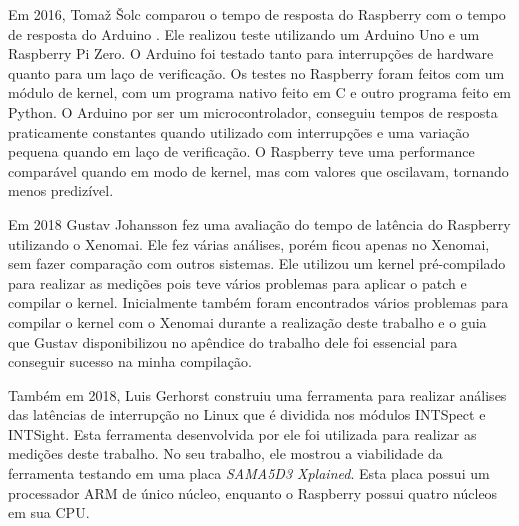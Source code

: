 Em 2016, Tomaž Šolc comparou o tempo de resposta do Raspberry com o tempo de resposta do Arduino \cite{Solc2016}. Ele realizou teste utilizando um Arduino Uno e um Raspberry Pi Zero. O Arduino foi testado tanto para interrupções de hardware quanto para um laço de verificação. Os testes no Raspberry foram feitos com um módulo de kernel, com um programa nativo feito em C e outro programa feito em Python. O Arduino por ser um microcontrolador, conseguiu tempos de resposta praticamente constantes quando utilizado com interrupções e uma variação pequena quando em laço de verificação. O Raspberry teve uma performance comparável quando em modo de kernel, mas com valores que oscilavam, tornando menos predizível.

Em 2018 Gustav Johansson \cite{Johansson2018} fez uma avaliação do tempo de latência do Raspberry utilizando o Xenomai. Ele fez várias análises, porém ficou apenas no Xenomai, sem fazer comparação com outros sistemas. Ele utilizou um kernel pré-compilado para realizar as medições pois teve vários problemas para aplicar o patch e compilar o kernel. Inicialmente também foram encontrados vários problemas para compilar o kernel com o Xenomai durante a realização deste trabalho e o guia que Gustav disponibilizou no apêndice do trabalho dele foi essencial para conseguir sucesso na minha compilação.

Também em 2018, Luis Gerhorst \cite{Gerhorst2018} construiu uma ferramenta para realizar análises das latências de interrupção no Linux que é dividida nos módulos INTSpect e INTSight. Esta ferramenta desenvolvida por ele foi utilizada para realizar as medições deste trabalho. No seu trabalho, ele mostrou a viabilidade da ferramenta testando em uma placa \textit{SAMA5D3 Xplained}. Esta placa possui um processador ARM de único núcleo, enquanto o Raspberry possui quatro núcleos em sua CPU.

